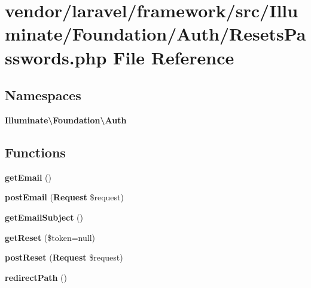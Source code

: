 \section{vendor/laravel/framework/src/\+Illuminate/\+Foundation/\+Auth/\+Resets\+Passwords.php File Reference}
\label{_resets_passwords_8php}
\subsection*{Namespaces}
\begin{DoxyCompactItemize}
\item 
 {\bf Illuminate\textbackslash{}\+Foundation\textbackslash{}\+Auth}
\end{DoxyCompactItemize}
\subsection*{Functions}
\begin{DoxyCompactItemize}
\item 
{\bf get\+Email} ()
\item 
{\bf post\+Email} ({\bf Request} \$request)
\item 
{\bf get\+Email\+Subject} ()
\item 
{\bf get\+Reset} (\$token=null)
\item 
{\bf post\+Reset} ({\bf Request} \$request)
\item 
{\bf redirect\+Path} ()
\end{DoxyCompactItemize}
